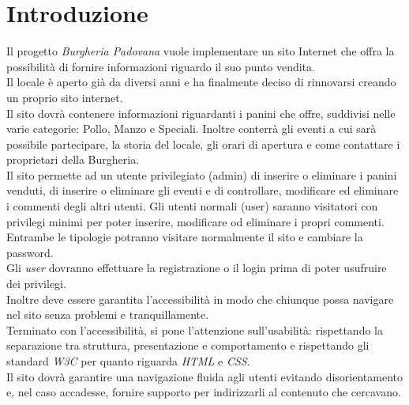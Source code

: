\section{Introduzione}
Il progetto \emph{Burgheria Padovana} vuole implementare un sito Internet che offra la possibilità di fornire informazioni riguardo il suo punto vendita.\\
Il locale è aperto già da diversi anni e ha finalmente deciso di rinnovarsi creando un proprio sito internet.\\
Il sito dovrà contenere informazioni riguardanti i panini che offre, suddivisi nelle varie categorie: Pollo, Manzo e Speciali. 
Inoltre conterrà gli eventi a cui sarà possibile partecipare, la storia del locale, gli orari di apertura e come contattare i proprietari della Burgheria.\\
Il sito permette ad un utente privilegiato (admin) di inserire o eliminare i panini venduti, di inserire o eliminare gli eventi e di controllare, modificare ed eliminare i commenti degli altri utenti. Gli utenti normali (user) saranno visitatori 
con privilegi minimi per poter inserire, modificare od eliminare i propri commenti.\\
Entrambe le tipologie potranno visitare normalmente il sito e cambiare la password.\\
Gli \emph{user} dovranno effettuare la registrazione o il login prima di poter usufruire dei privilegi.\\
Inoltre deve essere garantita l'accessibilità in modo che chiunque possa navigare nel sito senza problemi e tranquillamente.\\
Terminato con l'accessibilità, si pone l'attenzione sull'usabilità: rispettando la separazione tra struttura, presentazione e comportamento e rispettando gli standard \emph{W3C} per quanto riguarda \emph{HTML} e \emph{CSS}.\\
Il sito dovrà garantire una navigazione fluida agli utenti evitando disorientamento e, nel caso accadesse, fornire supporto per indirizzarli al contenuto che cercavano.\\